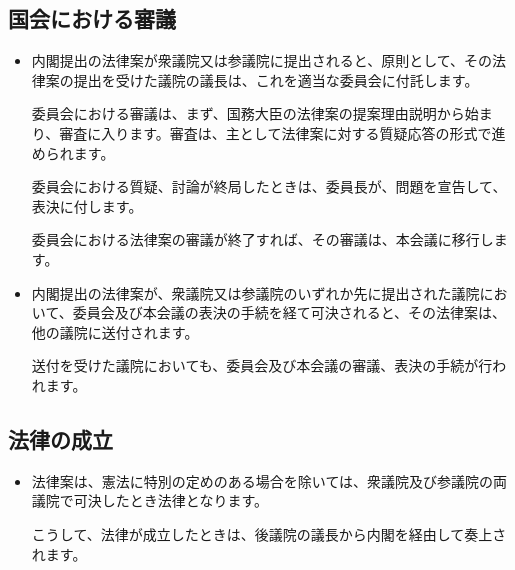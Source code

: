 \subsection {国会における審議}
\begin {itemize}
\item 内閣提出の法律案が衆議院又は参議院に提出されると、原則として、その法律案の提出を受けた議院の議長は、これを適当な委員会に付託します。\par
  委員会における審議は、まず、国務大臣の法律案の提案理由説明から始まり、審査に入ります。審査は、主として法律案に対する質疑応答の形式で進められます。\par
  委員会における質疑、討論が終局したときは、委員長が、問題を宣告して、表決に付します。\par
  委員会における法律案の審議が終了すれば、その審議は、本会議に移行します。\par
\item 内閣提出の法律案が、衆議院又は参議院のいずれか先に提出された議院において、委員会及び本会議の表決の手続を経て可決されると、その法律案は、他の議院に送付されます。\par
  送付を受けた議院においても、委員会及び本会議の審議、表決の手続が行われます。\par
\end {itemize}

\subsection {法律の成立}
\begin {itemize}
\item 法律案は、憲法に特別の定めのある場合を除いては、衆議院及び参議院の両議院で可決したとき法律となります。\par
  こうして、法律が成立したときは、後議院の議長から内閣を経由して奏上されます。\par
\end {itemize}

